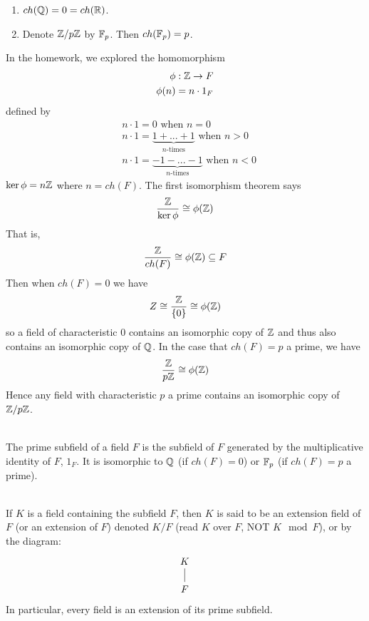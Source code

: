 \begin{example}
    \begin{enumerate}
        \item $ch(\mathbb{Q}) = 0 = ch(\mathbb{R})$.
        \item Denote $\mathbb{Z}/p\mathbb{Z}$ by $\mathbb{F}_p$. Then $ch(\mathbb{F}_p) = p$.
    \end{enumerate}
    In the homework, we explored the homomorphism
    \begin{align*}
        \phi&:\mathbb{Z} \to F \\
        \phi(n)&= n \cdot 1_F \\
    \end{align*}
    defined by 
    \begin{align*}
        &n\cdot 1 = 0 \text{ when } n = 0 \\
        &n\cdot 1 = \underbrace{1+...+1}_{n \text{-times}} \text{ when } n > 0 \\
        &n \cdot 1 = \underbrace{-1-...-1}_{n \text{-times}} \text{ when } n < 0
    \end{align*}
    $\ker \phi = n \mathbb{Z}$ where $n = ch(F)$. The first isomorphism theorem says
    $$\frac{\mathbb{Z}}{\ker \phi} \cong \phi(\mathbb{Z})$$
    That is,
    $$\frac{\mathbb{Z}}{ch(F)} \cong \phi(\mathbb{Z}) \subseteq F$$
    Then when $ch(F) = 0$ we have
    $$Z \cong \frac{\mathbb{Z}}{\left\{0\right\}} \cong \phi(\mathbb{Z})$$
    so a field of characteristic $0$ contains an isomorphic copy of $\mathbb{Z}$ and thus also contains an isomorphic copy of $\mathbb{Q}$. In the case that $ch(F) = p$ a prime, we have
    $$\frac{\mathbb{Z}}{p\mathbb{Z}}\cong \phi(\mathbb{Z})$$
    Hence any field with characteristic $p$ a prime contains an isomorphic copy of $\mathbb{Z}/p\mathbb{Z}$.
\end{example}

\begin{definition} \leavevmode \\
    The prime subfield of a field $F$ is the subfield of $F$ generated by the multiplicative identity of $F$, $1_F$. It is isomorphic to $\mathbb{Q}$ (if $ch(F) = 0$) or $\mathbb{F}_p$ (if $ch(F) = p$ a prime).
\end{definition}

\begin{definition} \leavevmode \\
    If $K$ is a field containing the subfield $F$, then $K$ is said to be an extension field of $F$ (or an extension of $F$) denoted $K/F$ (read $K$ over $F$, NOT $K \mod F$), or by the diagram:
    $$
    \begin{tikzcd}[row sep=0.5cm]
        K \arrow [d,-] \\
        F
    \end{tikzcd}
    $$
    In particular, every field is an extension of its prime subfield.
\end{definition}

